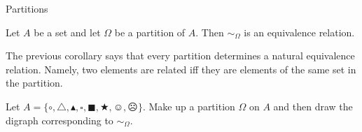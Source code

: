 \begin{section}{Partitions}
\begin{corollary}
Let $A$ be a set and let $\Omega$ be a partition of $A$.  Then $\sim_{\Omega}$ is an equivalence relation.
\end{corollary}

The previous corollary says that every partition determines a natural equivalence relation.  Namely, two elements are related iff they are elements of the same set in the partition.

\begin{exercise}
Let $A=\{\circ, \triangle, \blacktriangle, \square, \blacksquare, \bigstar, \smiley, \frownie\}$.  Make up a partition $\Omega$ on $A$ and then draw the digraph corresponding to $\sim_{\Omega}$.
\end{exercise}

\end{section}